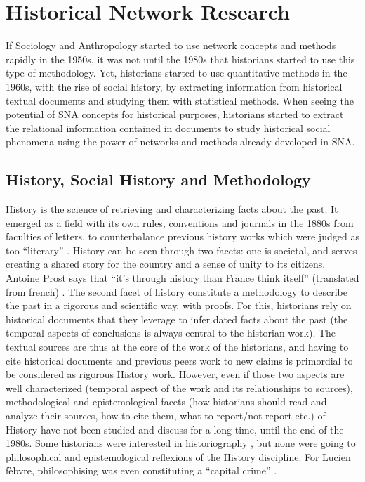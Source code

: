 \section{Historical Network Research}\label{sec:historical-network-research}

If Sociology and Anthropology started to use network concepts and methods rapidly in the 1950s, it was not until the 1980s that historians started to use this type of methodology.
Yet, historians started to use quantitative methods in the 1960s, with the rise of social history, by extracting information from historical textual documents and studying them with statistical methods.
When seeing the potential of SNA concepts for historical purposes, historians started to extract the relational information contained in documents to study historical social phenomena using the power of networks and methods already developed in SNA.


\subsection{History, Social History and Methodology}\label{subsec:history-and-social-history}

History is the science of retrieving and characterizing facts about the past.
It emerged as a field with its own rules, conventions and journals in the 1880s from faculties of letters, to counterbalance previous history works which were judged as too ``literary'' \cite{noirielNaissanceMétierHistorien1990}.
History can be seen through two facets: one is societal, and serves creating a shared story for the country and a sense of unity to its citizens.
Antoine Prost says that ``it's through history than France think itself'' (translated from french) \cite{prost2014}.
The second facet of history constitute a methodology to describe the past in a rigorous and scientific way, with proofs.
For this, historians rely on historical documents that they leverage to infer dated facts about the past (the temporal aspects of conclusions is always central to the historian work).
The textual sources are thus at the core of the work of the historians, and having to cite historical documents and previous peers work to new claims is primordial to be considered as rigorous History work.
However, even if those two aspects are well characterized (temporal aspect of the work and its relationships to sources), methodological and epistemological facets (how historians should read and analyze their sources, how to cite them, what to report/not report etc.) of History have not been studied and discuss for a long time, until the end of the 1980s.
Some historians were interested in historiography \cite{carbonellHistoriographie1981}, but none were going to philosophical and epistemological reflexions of the History discipline.
For Lucien fèbvre, philosophising was even constituting a ``capital crime'' \cite{febvreVERSAUTREHISTOIRE1949, prost2014}.

